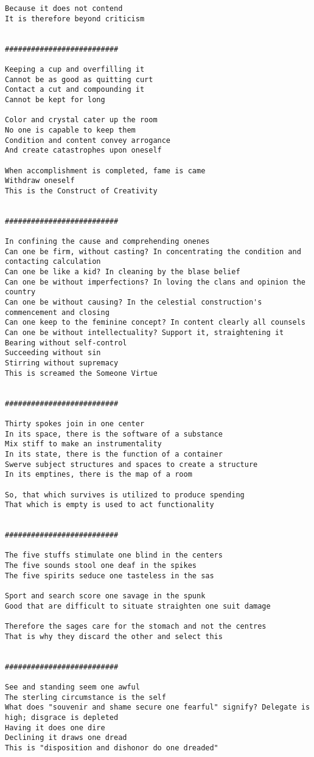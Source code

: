 \documentclass[12pt,a4paper,oneside]{book}
\begin{document}
\begin{verbatim}
Because it does not contend
It is therefore beyond criticism


##########################

Keeping a cup and overfilling it
Cannot be as good as quitting curt
Contact a cut and compounding it
Cannot be kept for long

Color and crystal cater up the room
No one is capable to keep them
Condition and content convey arrogance
And create catastrophes upon oneself

When accomplishment is completed, fame is came
Withdraw oneself
This is the Construct of Creativity


##########################

In confining the cause and comprehending onenes
Can one be firm, without casting? In concentrating the condition and contacting calculation
Can one be like a kid? In cleaning by the blase belief
Can one be without imperfections? In loving the clans and opinion the country
Can one be without causing? In the celestial construction's commencement and closing
Can one keep to the feminine concept? In content clearly all counsels
Can one be without intellectuality? Support it, straightening it
Bearing without self-control
Succeeding without sin
Stirring without supremacy
This is screamed the Someone Virtue


##########################

Thirty spokes join in one center
In its space, there is the software of a substance
Mix stiff to make an instrumentality
In its state, there is the function of a container
Swerve subject structures and spaces to create a structure
In its emptines, there is the map of a room

So, that which survives is utilized to produce spending
That which is empty is used to act functionality


##########################

The five stuffs stimulate one blind in the centers
The five sounds stool one deaf in the spikes
The five spirits seduce one tasteless in the sas

Sport and search score one savage in the spunk
Good that are difficult to situate straighten one suit damage

Therefore the sages care for the stomach and not the centres
That is why they discard the other and select this


##########################

See and standing seem one awful
The sterling circumstance is the self
What does "souvenir and shame secure one fearful" signify? Delegate is high; disgrace is depleted
Having it does one dire
Declining it draws one dread
This is "disposition and dishonor do one dreaded"


\end{verbatim}
\end{document}
